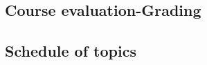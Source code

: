 \documentclass[12pt]{files/handoutX}
\begin{document}
\subsection*{Course evaluation-Grading} 


%


\newpage 

\subsection*{Schedule of topics} 



%




%

%



\end{document}
